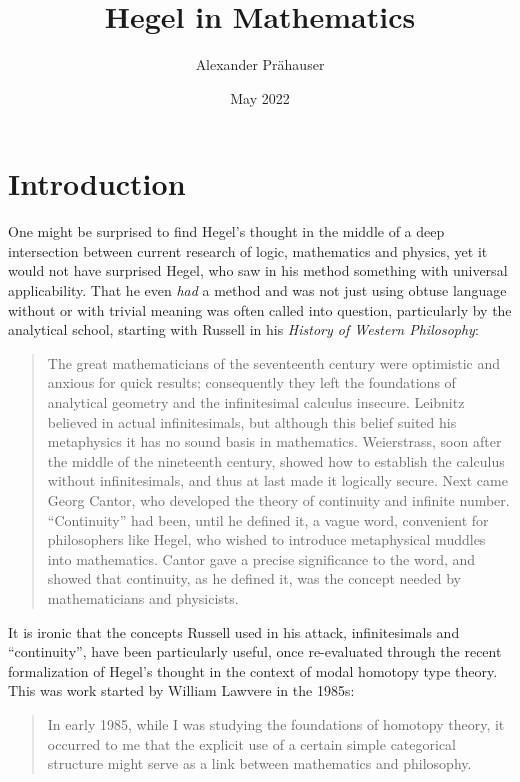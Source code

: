 \documentclass{article}
\title{Hegel in Mathematics}
\author{Alexander Prähauser}
\date{May 2022}
\begin{document}
\maketitle

\tableofcontents

\section{Introduction}
One might be surprised to find Hegel's thought in the middle of a deep intersection between current research
of logic, mathematics and physics, yet it would not have surprised Hegel, who saw in his method something
with universal applicability. That he even \emph{had} a method and was not just using obtuse language
without or with trivial meaning was often called into question, particularly by the analytical school,
starting with Russell in his \emph{History of Western Philosophy}\cite{Russ}:

\begin{quote}
    The great mathematicians of the seventeenth century were optimistic and anxious for quick results;
consequently they left the foundations of analytical geometry and the infinitesimal calculus insecure.
Leibnitz believed in actual infinitesimals, but although this belief suited his metaphysics it has no
sound basis in mathematics. Weierstrass, soon after the middle of the nineteenth century, showed how to
establish the calculus without infinitesimals, and thus at last made it logically secure. Next came Georg
Cantor, who developed the theory of continuity and infinite number. ``Continuity'' had been, until he
defined it, a vague word, convenient for philosophers like Hegel, who wished to introduce metaphysical
muddles into mathematics. Cantor gave a precise significance to the word, and showed that continuity,
as he defined it, was the concept needed by mathematicians and physicists.
\end{quote}

It is ironic that the concepts Russell used in his attack, infinitesimals and ``continuity'', have been
particularly useful, once re-evaluated through the recent formalization of Hegel's thought in the context
of modal homotopy type theory. This was work started by William Lawvere in the 1985s\cite{Law96}:

\begin{quote}
    In early 1985, while I was studying the foundations of homotopy theory, it occurred to me that the
explicit use of a certain simple categorical structure might serve as a link between mathematics and philosophy.

\end{quote}
\end{document}

